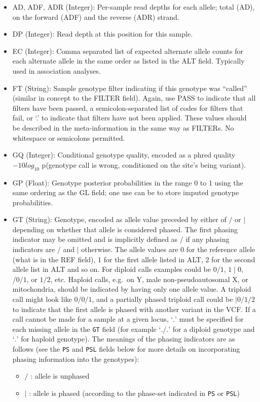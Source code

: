 \documentclass[8pt]{article}
\begin{document}
\begin{itemize}
\renewcommand{\labelitemii}{$\circ$}
  \item AD, ADF, ADR (Integer): Per-sample read depths for each allele; total (AD), on the forward (ADF) and the reverse (ADR) strand.
  \item DP (Integer): Read depth at this position for this sample.
  \item EC (Integer): Comma separated list of expected alternate allele counts for each alternate allele in the same order as listed in the ALT field.
  Typically used in association analyses.
  \item FT (String): Sample genotype filter indicating if this genotype was ``called'' (similar in concept to the FILTER field).
  Again, use PASS to indicate that all filters have been passed, a semicolon-separated list of codes for filters that fail, or `.' to indicate that filters have not been applied.
  These values should be described in the meta-information in the same way as FILTERs.
  No whitespace or semicolons permitted.
  \item GQ (Integer): Conditional genotype quality, encoded as a phred quality $-10log_{10}$ p(genotype call is wrong, conditioned on the site's being variant).
  \item GP (Float): Genotype posterior probabilities in the range 0 to 1 using the same ordering as the GL field; one use can be to store imputed genotype probabilities.
  \item GT (String): Genotype, encoded as allele value preceded by either of $/$ or $\mid$ depending on whether that allele is considered phased. 
    The first phasing indicator may be omitted and is implicitly defined as $/$ if any phasing indicators are $/$ and $\mid$ otherwise.
    The allele values are 0 for the reference allele (what is in the REF field), 1 for the first allele listed in ALT, 2 for the second allele list in ALT and so on.
    For diploid calls examples could be $0/1$, $1\mid0$, $/0/1$, or $1/2$, etc.
    Haploid calls, e.g.\ on Y, male non-pseudoautosomal X, or mitochondria, should be indicated by having only one allele value.
    A triploid call might look like $0/0/1$, and a partially phased triploid call could be $|0/1/2$ to indicate that the first allele is phased with another variant in the VCF.
    If a call cannot be made for a sample at a given locus, `$.$' must be specified for each missing allele in the {\tt GT} field (for example `$./.$' for a diploid genotype and `$.$' for haploid genotype).
    The meanings of the phasing indicators are as follows (see the {\tt PS} and {\tt PSL} fields below for more details on incorporating phasing information into the genotypes):
    \begin{itemize}
      \item $/$ : allele is unphased
      \item $\mid$ : allele is phased (according to the phase-set indicated in {\tt PS} or {\tt PSL})
    \end{itemize}


\end{itemize}
\end{document}
